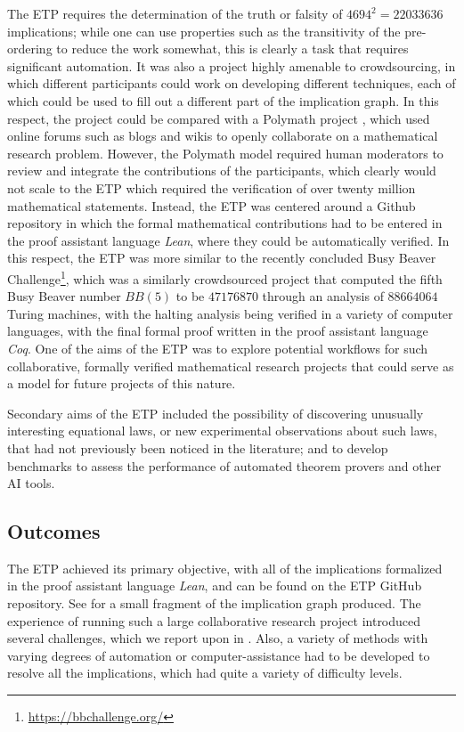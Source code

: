 The ETP requires the determination of the truth or falsity of $4694^2 = 22033636$ implications; while one can use properties such as the transitivity of the pre-ordering to reduce the work somewhat, this is clearly a task that requires significant automation. It was also a project highly amenable to crowdsourcing, in which different participants could work on developing different techniques, each of which could be used to fill out a different part of the implication graph. In this respect, the project could be compared with a Polymath project \cite{Gowers2009}, which used online forums such as blogs and wikis to openly collaborate on a mathematical research problem. However, the Polymath model required human moderators to review and integrate the contributions of the participants, which clearly would not scale to the ETP which required the verification of over twenty million mathematical statements. Instead, the ETP was centered around a Github repository in which the formal mathematical contributions had to be entered in the proof assistant language \emph{Lean}, where they could be automatically verified. In this respect, the ETP was more similar to the recently concluded Busy Beaver Challenge\footnote{\url{https://bbchallenge.org/}}, which was a similarly crowdsourced project that computed the fifth Busy Beaver number $BB(5)$ to be $47176870$ through an analysis of $88664064$ Turing machines, with the halting analysis being verified in a variety of computer languages, with the final formal proof written in the proof assistant language \emph{Coq}. One of the aims of the ETP was to explore potential workflows for such collaborative, formally verified mathematical research projects that could serve as a model for future projects of this nature.

Secondary aims of the ETP included the possibility of discovering unusually interesting equational laws, or new experimental observations about such laws, that had not previously been noticed in the literature; and to develop benchmarks to assess the performance of automated theorem provers and other AI tools.

\subsection{Outcomes}

The ETP achieved its primary objective, with all of the implications formalized in the proof assistant language \emph{Lean}, and can be found on the ETP GitHub repository.  See  for a small fragment of the implication graph produced. The experience of running such a large collaborative research project introduced several challenges, which we report upon in . Also, a variety of methods with varying degrees of automation or computer-assistance had to be developed to resolve all the implications, which had quite a variety of difficulty levels.

